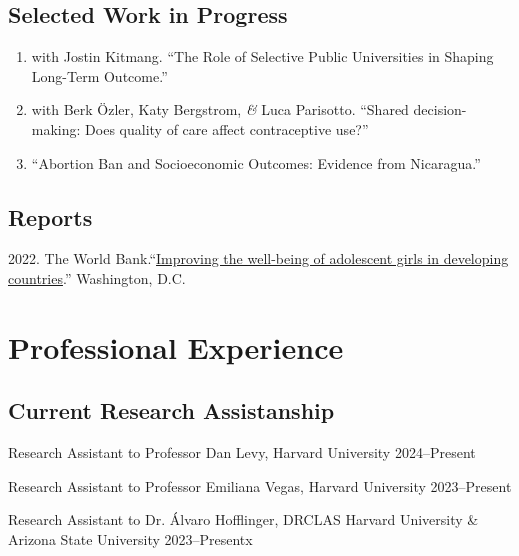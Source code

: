 \documentclass[a4paper, 10pt]{article}
\renewenvironment{itemize}{
  \begin{list}{}
    { \setlength{\itemsep}{5pt}
      \setlength{\parsep}{0pt}
      \setlength{\topsep}{0pt}
      \setlength{\leftmargin}{0em} } }{
  \end{list}}
\begin{document}
\subsection*{Selected Work in Progress}

\begin{enumerate}[leftmargin=10pt, label={}, itemindent=-10pt, nosep]
  \item with Jostin Kitmang. ``The Role of Selective Public Universities in Shaping Long-Term Outcome.''
  \item with Berk Özler, Katy Bergstrom, \textit{\&} Luca Parisotto. ``Shared decision-making: Does quality of care affect contraceptive use?''
  \item ``Abortion Ban and Socioeconomic Outcomes: Evidence from Nicaragua.''
\end{enumerate}

\subsection*{Reports}

\begin{itemize}
  \item 2022. The World Bank.``\href{https://documents1.worldbank.org/curated/en/099025312242111019/pdf/P1699940bcc13001a083820804f74e8151b.pdf}{Improving the well-being of adolescent girls in developing countries}.'' Washington, D.C.
\end{itemize}


\section*{Professional Experience}

\subsection*{Current Research Assistanship}

\begin{itemize}
  \item Research Assistant to Professor Dan Levy, Harvard University
  \hfill 2024--Present
  \item Research Assistant to Professor Emiliana Vegas, Harvard University
  \hfill 2023--Present
  \item Research Assistant to Dr. Álvaro Hofflinger, DRCLAS Harvard University
  \& Arizona State University
  \hfill 2023--Presentx
\end{itemize}
\end{document}
